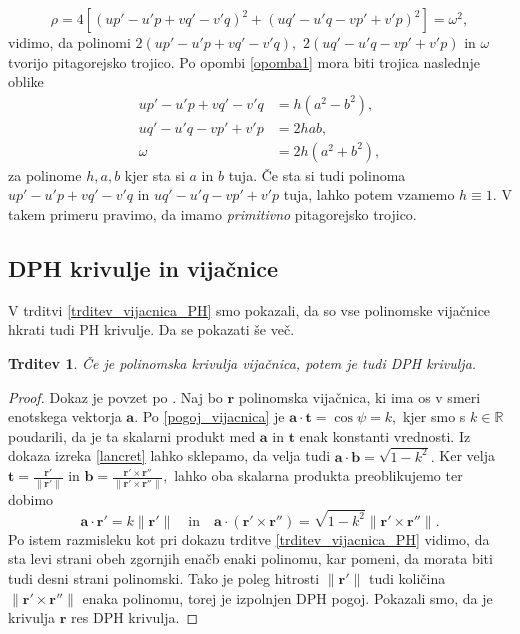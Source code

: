 \documentclass[12pt,a4paper,twoside]{article}
\theoremstyle{definition} %
\theoremstyle{plain} %
\newtheorem{trditev}[definicija]{Trditev}
\theoremstyle{primerstyle}
\numberwithin{equation}{section}  %
\newcommand{\R}{\mathbb R}
\newcommand{\binormala}{\frac{\mathbf{r}'\times\mathbf{r}''}{\lVert \mathbf{r}'\times\mathbf{r}'' \rVert}}
\newcommand{\tV}{\mathbf{t}}
\newcommand{\aV}{\mathbf{a}}
\newcommand{\bV}{\mathbf{b}}
\newcommand{\rV}{\mathbf{r}}
\newcommand{\ndr}{\lVert \mathbf{r}'\rVert} %
\newcommand{\ndrtddr}{\lVert \mathbf{r}'\times \mathbf{r}'' \rVert} %
\begin{document}
\begin{equation}
	\label{rho_omega2}
	\rho=4[(up'-u'p+vq'-v'q)^2+(uq'-u'q-vp'+v'p)^2]=\omega^2,
\end{equation}
vidimo, da polinomi $2(up'-u'p+vq'-v'q),$ $2(uq'-u'q-vp'+v'p)$ in $\omega$ tvorijo pitagorejsko trojico. Po opombi \ref{opomba1} mora biti trojica naslednje oblike
\begin{align}
	up'-u'p+vq'-v'q&=h(a^2-b^2), \nonumber \\
	uq'-u'q-vp'+v'p&=2hab, \label{kubota} \\
	\omega&=2h(a^2+b^2), \nonumber
\end{align}
za polinome $h,a,b$ kjer sta si $a$ in $b$ tuja. Če sta si tudi polinoma $up'-u'p+vq'-v'q$ in $uq'-u'q-vp'+v'p$ tuja, lahko potem vzamemo $h\equiv 1.$ V takem primeru pravimo, da imamo \emph{primitivno} pitagorejsko trojico.

\subsection{DPH krivulje in vijačnice}
\label{sec_DPH_in_vijacnice}

V trditvi \ref{trditev_vijacnica_PH} smo pokazali, da so vse polinomske vijačnice hkrati tudi PH krivulje. Da se pokazati še več.
\begin{trditev}
	\label{trditev_vijacnica_DPH}
	Če je polinomska krivulja vijačnica, potem je tudi DPH krivulja.
\end{trditev}
\begin{proof}
	Dokaz je povzet po \cite{beltranmonterde}. Naj bo $\rV$ polinomska vijačnica, ki ima os v smeri enotskega vektorja $\aV.$ Po \eqref{pogoj_vijacnica} je $\aV\cdot\tV=\cos \psi=k,$ kjer smo s $k \in \R$ poudarili, da je ta skalarni produkt med $\aV$ in $\tV$ enak konstanti vrednosti. Iz dokaza izreka \ref{lancret} lahko sklepamo, da velja tudi $\aV\cdot\bV=\sqrt{1-k^2}.$ Ker velja $\tV=\frac{\rV'}{\lVert \rV' \rVert}$ in $\bV=\binormala,$ lahko oba skalarna produkta preoblikujemo ter dobimo
	\begin{equation}
		\aV\cdot\rV'=k\ndr \quad \text{in} \quad \aV\cdot (\rV'\times\rV'')=\sqrt{1-k^2}\ndrtddr .
	\end{equation}
	Po istem razmisleku kot pri dokazu trditve \ref{trditev_vijacnica_PH} vidimo, da sta levi strani obeh zgornjih enačb enaki polinomu, kar pomeni, da morata biti tudi desni strani polinomski. Tako je poleg hitrosti $\ndr$ tudi količina $\ndrtddr$ enaka polinomu, torej je izpolnjen DPH pogoj. Pokazali smo, da je krivulja $\rV$ res DPH krivulja.
\end{proof}
\end{document}

